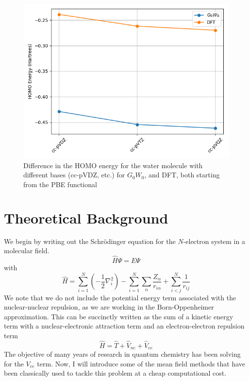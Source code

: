 \documentclass[12pt]{caltech_thesis}
\begin{document}
\begin{figure}[h]
    \centering
    \includegraphics[width=\textwidth]{water_gw.png}
    \caption{Difference in the HOMO energy for the water molecule with different bases (cc-pVDZ, etc.) for $G_0W_0$, and DFT, both starting from the PBE functional}
    \label{fig:water_homo}
\end{figure}


\chapter{Theoretical Background}
We begin by writing out the Schrödinger equation for the $N$-electron system in a molecular field. 
\begin{equation}
    \hat{H}\Psi =E\Psi 
\end{equation}
with
\begin{equation}
\hat{H}=\sum_{i=1}^N\left(-\frac{1}{2} \nabla_i^2\right)-\sum_{i=1}^N \sum_{\alpha }\frac{Z_{\alpha }}{r_{i\alpha }}+\sum_{i<j}^N \frac{1}{r_{i j}}
\end{equation}
We note that we do not include the potential energy term associated with the nuclear-nuclear repulsion, as we are working in the Born-Oppenheimer approximation. This can be succinctly written as the sum of a kinetic energy term with a nuclear-electronic attraction term and an electron-electron repulsion term  
\begin{equation}
    \hat{H}= \hat{T}+ \hat{V}_{ne}+\hat{V}_{ee}
\end{equation}
The objective of many years of research in quantum chemistry has been solving for the $V_{ee}$ term. Now, I will introduce some of the mean field methods that have been classically used to tackle this problem at a cheap computational cost.
\end{document}
